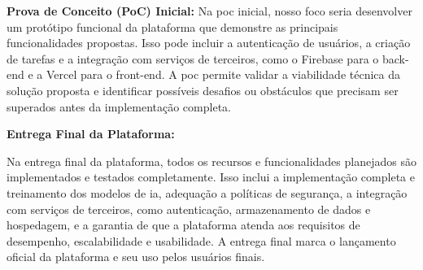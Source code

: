 \textbf{Prova de Conceito (PoC) Inicial:}
Na \acs{poc} inicial, nosso foco seria desenvolver um protótipo funcional da plataforma que demonstre as principais funcionalidades propostas. Isso pode incluir a autenticação de usuários, a criação de tarefas e a integração com serviços de terceiros, como o Firebase para o back-end e a Vercel para o front-end. A \acs{poc} permite validar a viabilidade técnica da solução proposta e identificar possíveis desafios ou obstáculos que precisam ser superados antes da implementação completa.

\textbf{Entrega Final da Plataforma:}

Na entrega final da plataforma, todos os recursos e funcionalidades planejados são implementados e testados completamente. Isso inclui a implementação completa e treinamento dos modelos de \acs{ia}, adequação a políticas de segurança, a integração com serviços de terceiros, como autenticação, armazenamento de dados e hospedagem, e a garantia de que a plataforma atenda aos requisitos de desempenho, escalabilidade e usabilidade. A entrega final marca o lançamento oficial da plataforma e seu uso pelos usuários finais.